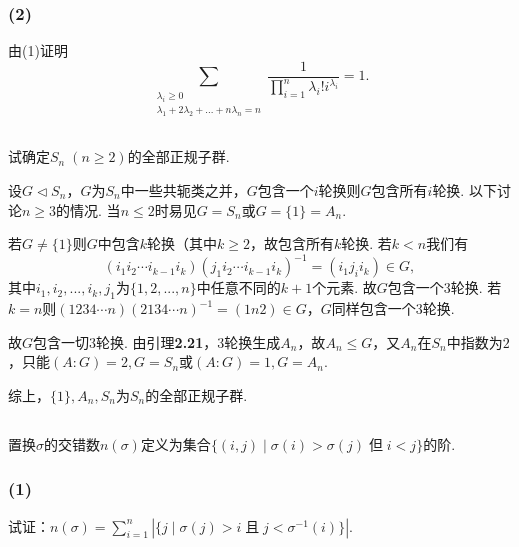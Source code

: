 \subsubsection{(2)}
由(1)证明
$$\sum_{\substack{\lambda_i\geq 0\\\lambda_1+2\lambda_2+...+n\lambda_n=n}}\frac{1}{\prod_{i=1}^{n}\lambda_i!i^{\lambda_i}}=1.$$


\subsection{}
试确定$S_n\;(n\geq 2)$的全部正规子群.

\jie
设$G\vartriangleleft S_n$，$G$为$S_n$中一些共轭类之并，$G$包含一个$i$轮换则$G$包含所有$i$轮换. 以下讨论$n\geq 3$的情况. 当$n\leq 2$时易见$G=S_n$或$G=\{1\}=A_n$.

若$G\neq \{1\}$则$G$中包含$k$轮换（其中$k\geq 2$，故包含所有$k$轮换. 若$k<n$我们有
$$(i_1i_2\cdots i_{k-1}i_k)(j_1i_2\cdots i_{k-1}i_k)^{-1}=(i_1j_ii_k)\in G,$$
其中$i_1, i_2, ..., i_k, j_1$为$\{1,2,...,n\}$中任意不同的$k+1$个元素. 故$G$包含一个$3$轮换.
若$k=n$则$(1234\cdots n)(2134\cdots n)^{-1}=(1n2)\in G$，$G$同样包含一个$3$轮换.

故$G$包含一切$3$轮换. 由{\heiti 引理}\textbf{2.21}，$3$轮换生成$A_n$，故$A_n\leq G$，又$A_n$在$S_n$中指数为$2$，只能$(A:G)=2, G=S_n$或$(A:G)=1, G=A_n$.

综上，$\{1\}, A_n, S_n$为$S_n$的全部正规子群.

\subsection{}
置换$\sigma$的交错数$n(\sigma)$定义为集合$\{(i,j)\mid\sigma(i)>\sigma(j)\;\text{但}\;i<j\}$的阶.
\subsubsection{(1)}
试证：$n(\sigma)=\sum_{i=1}^n\left|\{j\mid\sigma(j)>i\;\text{且}\;j<\sigma^{-1}(i)\}\right|$.


